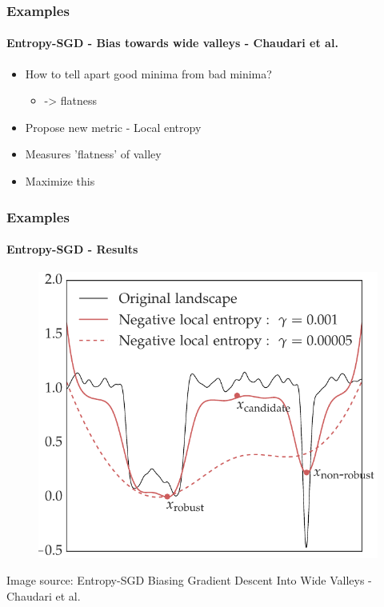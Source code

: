 \documentclass[9pt]{beamer}
\begin{document}
\begin{frame}
\frametitle{Examples}
\framesubtitle{Entropy-SGD - Bias towards wide valleys - Chaudari et al.}
\begin{itemize}%
	\item How to tell apart good minima from bad minima?
	\begin{itemize}
		\item -> flatness
	\end{itemize}
	\item Propose new metric - Local entropy
	\item Measures 'flatness' of valley
	\item Maximize this

\end{itemize}
\end{frame} 




\begin{frame}
\frametitle{Examples}
\framesubtitle{Entropy-SGD - Results}
\begin{figure}
	\includegraphics[width=.7\linewidth]{figures/entropy_1.png}
\end{figure}
\tiny\color{lightgray}Image source: Entropy-SGD Biasing Gradient Descent Into Wide Valleys - Chaudari et al.
\end{frame}
\end{document}
